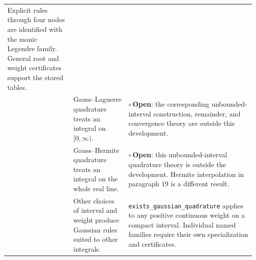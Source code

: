 \documentclass[11pt]{article}
\newcommand{\openproof}{\textcolor{opencolor}{\ensuremath{\circ}\,\textbf{Open}}}
\newcommand{\code}[1]{%
  \ifmmode\text{\texttt{\detokenize{#1}}}\else\nolinkurl{#1}\fi}
\begin{document}
\begin{longtable}{@{}>{\raggedright\arraybackslash}p{0.45cm}
  >{\raggedright\arraybackslash}p{6.0cm}
  >{\raggedright\arraybackslash}p{8.75cm}@{}}
Explicit rules through four nodes are identified with the monic Legendre
family. General root and weight certificates support the stored tables.\\
\addlinespace
22 & Gauss--Laguerre quadrature treats an integral on $[0,\infty)$. &
\openproof{}: the corresponding unbounded-interval construction,
remainder, and convergence theory are outside this development.\\
\addlinespace
23 & Gauss--Hermite quadrature treats an integral on the whole real line. &
\openproof{}: this unbounded-interval quadrature theory is outside the
development. Hermite interpolation in paragraph 19 is a different result.\\
\addlinespace
24 & Other choices of interval and weight produce Gaussian rules
suited to other integrals. &
\code{exists_gaussian_quadrature} applies to any positive continuous
weight on a compact interval. Individual named families require their own
specialization and certificates.\\
\end{longtable}
\endgroup

\begingroup
\small


\endgroup
\end{document}
